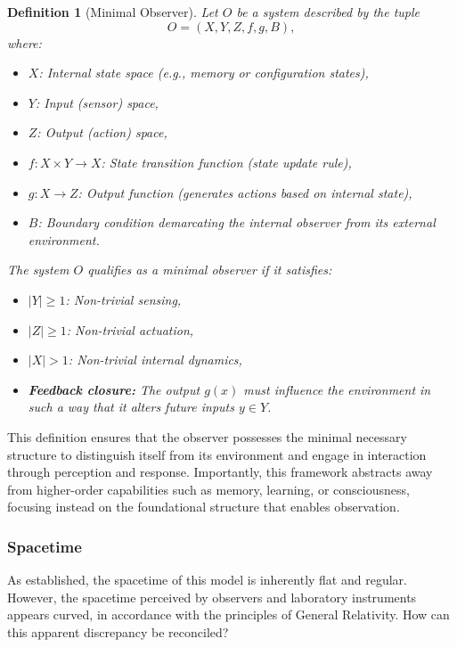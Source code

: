 \documentclass{ijuc}
\newtheorem{definition}{Definition}[section]
\begin{document}
\begin{definition}[Minimal Observer]
Let $O$ be a system described by the tuple
\[
O = (X, Y, Z, f, g, B),
\]
where:
\begin{itemize}
    \item $X$: Internal state space (e.g., memory or configuration states),
    \item $Y$: Input (sensor) space,
    \item $Z$: Output (action) space,
    \item $f: X \times Y \rightarrow X$: State transition function (state update rule),
    \item $g: X \rightarrow Z$: Output function (generates actions based on internal state),
    \item $B$: Boundary condition demarcating the internal observer from its external environment.
\end{itemize}

The system $O$ qualifies as a \emph{minimal observer} if it satisfies:
\begin{itemize}
    \item $|Y| \geq 1$: Non-trivial sensing,
    \item $|Z| \geq 1$: Non-trivial actuation,
    \item $|X| > 1$: Non-trivial internal dynamics,
    \item \textbf{Feedback closure:} The output $g(x)$ must influence the environment in such a way that it alters future inputs $y \in Y$.
\end{itemize}
\end{definition}

This definition ensures that the observer possesses the minimal necessary structure to distinguish itself from its environment and engage in interaction through perception and response. 
Importantly, this framework abstracts away from higher-order capabilities such as memory, learning, or consciousness, focusing instead on the foundational structure that enables observation.

\subsubsection{Spacetime}
As established, the spacetime of this model is inherently flat and regular. 
However, the spacetime perceived by observers and laboratory instruments appears curved, in accordance with the principles of General Relativity. 
How can this apparent discrepancy be reconciled?  
\end{document}
